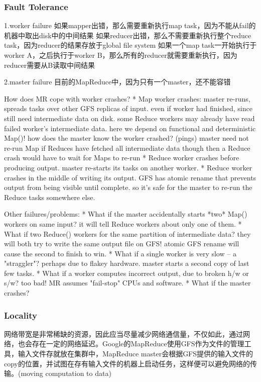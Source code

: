 \subsubsection{Fault Tolerance}
1.worker failure
如果mapper出错，那么需要重新执行map task，因为不能从fail的机器中取出disk中的中间结果
如果reducer出错，那么不需要重新执行整个reduce task，因为reducer的结果存放于global file system
如果一个map task一开始执行于worker A，之后执行于worker B，那么所有的reducer就需要重新执行，因为reducer需要从B读取中间结果

2.master failure
目前的MapReduce中，因为只有一个master，还不能容错

How does MR cope with worker crashes?
  * Map worker crashes:
    master re-runs, spreads tasks over other GFS replicas of input.
      even if worker had finished, since still need intermediate data on disk.
    some Reduce workers may already have read failed worker's intermediate data.
      here we depend on functional and deterministic Map()!
    how does the master know the worker crashed? (pings)
    master need not re-run Map if Reduces have fetched all intermediate data
      though then a Reduce crash would have to wait for Maps to re-run
  * Reduce worker crashes before producing output.
    master re-starts its tasks on another worker.
  * Reduce worker crashes in the middle of writing its output.
    GFS has atomic rename that prevents output from being visible until complete.
    so it's safe for the master to re-run the Reduce tasks somewhere else.

Other failures/problems:
  * What if the master accidentally starts *two* Map() workers on same input?
    it will tell Reduce workers about only one of them.
  * What if two Reduce() workers for the same partition of intermediate data?
    they will both try to write the same output file on GFS!
    atomic GFS rename will cause the second to finish to win.
  * What if a single worker is very slow -- a "straggler"?
    perhaps due to flakey hardware.
    master starts a second copy of last few tasks.
  * What if a worker computes incorrect output, due to broken h/w or s/w?
    too bad! MR assumes "fail-stop" CPUs and software.
  * What if the master crashes?

\subsubsection{Locality}
网络带宽是非常稀缺的资源，因此应当尽量减少网络通信量，不仅如此，通过网络，也会存在一定的网络延迟。Google的MapReduce使用GFS作为文件的管理工具，输入文件存就放在集群中，MapReduce master会根据GFS提供的输入文件的copy的位置，并试图在存有输入文件的机器上启动任务，这样便可以避免网络的传输。(moving computation to data)

